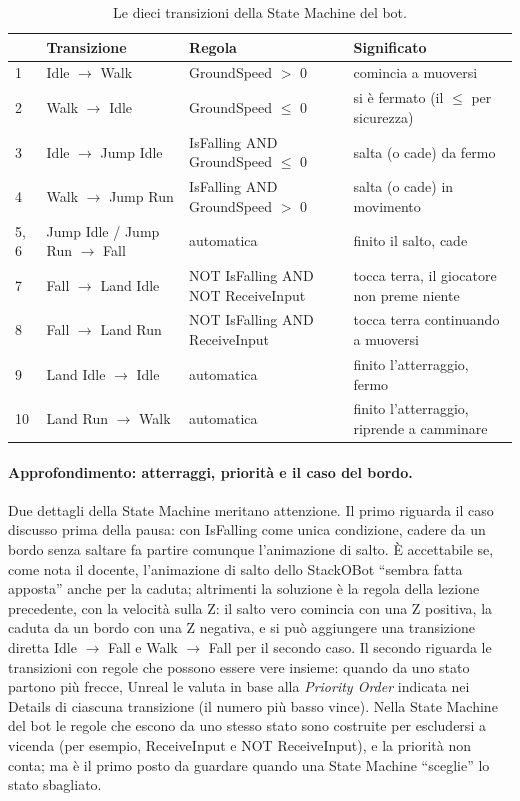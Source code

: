 \begin{table}[htbp]
\centering
\small
\begin{tabular}{@{}p{0.5cm}p{3.6cm}p{5.0cm}p{4.6cm}@{}}
\toprule
& \textbf{Transizione} & \textbf{Regola} & \textbf{Significato} \\
\midrule
1 & Idle $\rightarrow$ Walk & GroundSpeed $>$ 0 & comincia a muoversi \\
2 & Walk $\rightarrow$ Idle & GroundSpeed $\le$ 0 & si è fermato (il $\le$ per
sicurezza) \\
3 & Idle $\rightarrow$ Jump Idle & IsFalling AND GroundSpeed $\le$ 0 & salta (o cade)
da fermo \\
4 & Walk $\rightarrow$ Jump Run & IsFalling AND GroundSpeed $>$ 0 & salta (o cade) in
movimento \\
5, 6 & Jump Idle / Jump Run $\rightarrow$ Fall & automatica & finito il salto, cade \\
7 & Fall $\rightarrow$ Land Idle & NOT IsFalling AND NOT ReceiveInput & tocca terra, il
giocatore non preme niente \\
8 & Fall $\rightarrow$ Land Run & NOT IsFalling AND ReceiveInput & tocca terra
continuando a muoversi \\
9 & Land Idle $\rightarrow$ Idle & automatica & finito l'atterraggio, fermo \\
10 & Land Run $\rightarrow$ Walk & automatica & finito l'atterraggio, riprende a
camminare \\
\bottomrule
\end{tabular}
\caption{Le dieci transizioni della State Machine del bot.}
\label{ue10:tab:transizioni}
\end{table}

\paragraph{Approfondimento: atterraggi, priorità e il caso del bordo.} Due dettagli della
State Machine meritano attenzione. Il primo riguarda il caso discusso prima della pausa:
con IsFalling come unica condizione, cadere da un bordo senza saltare fa partire comunque
l'animazione di salto. È accettabile se, come nota il docente, l'animazione di salto dello
StackOBot ``sembra fatta apposta'' anche per la caduta; altrimenti la soluzione è la regola
della lezione precedente, con la velocità sulla Z: il salto vero comincia con una Z
positiva, la caduta da un bordo con una Z negativa, e si può aggiungere una transizione
diretta Idle $\rightarrow$ Fall e Walk $\rightarrow$ Fall per il secondo caso. Il secondo
riguarda le transizioni con regole che possono essere vere insieme: quando da uno stato
partono più frecce, Unreal le valuta in base alla \emph{Priority Order} indicata nei
Details di ciascuna transizione (il numero più basso vince). Nella State Machine del bot
le regole che escono da uno stesso stato sono costruite per escludersi a vicenda (per
esempio, ReceiveInput e NOT ReceiveInput), e la priorità non conta; ma è il primo posto da
guardare quando una State Machine ``sceglie'' lo stato sbagliato.

